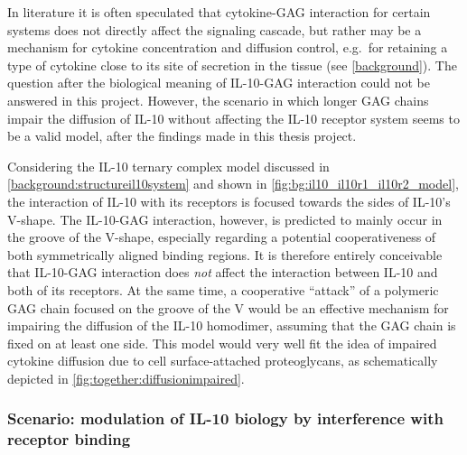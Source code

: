 In literature it is often speculated that cytokine-GAG interaction for certain
systems does not directly affect the signaling cascade, but rather may be a
mechanism for cytokine concentration and diffusion control, e.g.\ for retaining
a type of cytokine close to its site of secretion in the tissue (see
\cref{background}). The question after the biological meaning of IL-10-GAG
interaction could not be answered in this project. However, the scenario in
which longer GAG chains impair the diffusion of IL-10 without affecting the
IL-10 receptor system seems to be a valid model, after the findings made in this
thesis project.

Considering the IL-10 ternary complex model discussed in
\cref{background:structureil10system} and shown in
\cref{fig:bg:il10_il10r1_il10r2_model}, the interaction of IL-10 with its
receptors is focused towards the sides of IL-10's V-shape. The IL-10-GAG
interaction, however, is predicted to mainly occur in the groove of the V-shape,
especially regarding a potential cooperativeness of both symmetrically aligned
binding regions. It is therefore entirely conceivable that IL-10-GAG interaction
does \textit{not} affect the interaction between IL-10 and both of its
receptors. At the same time, a cooperative \enquote{attack} of a polymeric GAG
chain focused on the groove of the V would be an effective mechanism for
impairing the diffusion of the IL-10 homodimer, assuming that the GAG chain is
fixed on at least one side. This model would very well fit the idea of impaired
cytokine diffusion due to cell surface-attached proteoglycans, as schematically
depicted in \cref{fig:together:diffusionimpaired}.


\subsubsection{Scenario: modulation of IL-10 biology by interference with
receptor binding}

